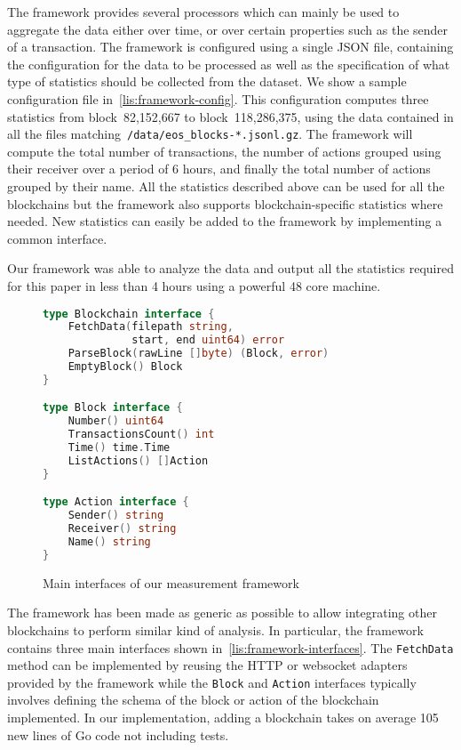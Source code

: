 The framework provides several processors which can mainly be used to aggregate the data either over time, or over certain properties such as the sender of a transaction.
The framework is configured using a single JSON file, containing the configuration for the data to be processed as well as the specification of what type of statistics should be collected from the dataset. We show a sample configuration file in~\autoref{lis:framework-config}.
This configuration computes three statistics from block~82,152,667 to block~118,286,375, using the data contained in all the files matching~\lstinline{/data/eos_blocks-*.jsonl.gz}.
The framework will compute the total number of transactions, the number of actions grouped using their receiver over a period of 6 hours, and finally the total number of actions grouped by their name.
All the statistics described above can be used for all the blockchains but the framework also supports blockchain-specific statistics where needed.
New statistics can easily be added to the framework by implementing a common interface.

Our framework was able to analyze the data and output all the statistics required for this paper in less than 4 hours using a powerful 48 core machine.

\begin{figure}[ht]
\begin{lstlisting}[language=go]
type Blockchain interface {
    FetchData(filepath string,
              start, end uint64) error
    ParseBlock(rawLine []byte) (Block, error)
    EmptyBlock() Block
}

type Block interface {
    Number() uint64
    TransactionsCount() int
    Time() time.Time
    ListActions() []Action
}

type Action interface {
    Sender() string
    Receiver() string
    Name() string
}
\end{lstlisting}
  \caption{Main interfaces of our measurement framework}
  \label{lis:framework-interfaces}
\end{figure}

The framework has been made as generic as possible to allow integrating other blockchains to perform similar kind of analysis.
In particular, the framework contains three main interfaces shown in~\autoref{lis:framework-interfaces}.
The \lstinline{FetchData} method can be implemented by reusing the HTTP or websocket adapters provided by the framework while the \lstinline{Block} and \lstinline{Action} interfaces typically involves defining the schema of the block or action of the blockchain implemented.
In our implementation, adding a blockchain takes on average 105 new lines of Go code not including tests.
